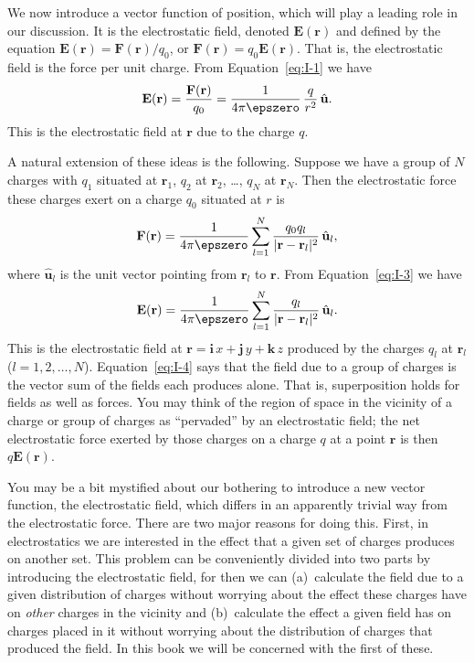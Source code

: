 We now introduce a vector function of position, which will play a leading role in our discussion. It is the electrostatic field, denoted $\mathbf{E}(\mathbf{r})$ and defined by the equation $\mathbf{E}(\mathbf{r}) = \mathbf{F}(\mathbf{r})/q_0$, or $\mathbf{F}(\mathbf{r}) = q_0 \mathbf{E}(\mathbf{r})$. That is, the electrostatic field is the force per unit charge. From Equation~\eqref{eq:I-1} we have
\begin{equation}
\mathbf{E}(\mathbf{r}) = \frac{\mathbf{F}(\mathbf{r})}{q_0} = \frac{1}{4\pi\epszero}\,\frac{q}{r^2}\,\hat{\mathbf{u}}.
\label{eq:I-2}
\end{equation}
This is the electrostatic field at $\mathbf{r}$ due to the charge $q$.

A natural extension of these ideas is the following. Suppose we have a group of $N$ charges with $q_1$ situated at $\mathbf{r}_1$, $q_2$ at $\mathbf{r}_2$, \ldots, $q_N$ at $\mathbf{r}_N$. Then the electrostatic force these charges exert on a charge $q_0$ situated at $r$ is
\begin{equation}
\mathbf{F}(\mathbf{r}) = \frac{1}{4\pi\epszero} \sum_{l=1}^{N} \frac{q_0 q_l}{|\mathbf{r} - \mathbf{r}_l|^2}\,\hat{\mathbf{u}}_l,
\label{eq:I-3}
\end{equation}
where $\hat{\mathbf{u}}_l$ is the unit vector pointing from $\mathbf{r}_l$ to $\mathbf{r}$. From Equation~\eqref{eq:I-3} we have
\begin{equation}
\mathbf{E}(\mathbf{r}) = \frac{1}{4\pi\epszero} \sum_{l=1}^{N} \frac{q_l}{|\mathbf{r} - \mathbf{r}_l|^2}\,\hat{\mathbf{u}}_l.
\label{eq:I-4}
\end{equation}
This is the electrostatic field at $\mathbf{r} = \mathbf{i}\,x + \mathbf{j}\,y + \mathbf{k}\,z$ produced by the charges $q_l$ at $\mathbf{r}_l$ ($l = 1, 2, \ldots, N$). Equation~\eqref{eq:I-4} says that the field due to a group of charges is the vector sum of the fields each produces alone. That is, superposition holds for fields as well as forces. You may think of the region of space in the vicinity of a charge or group of charges as ``pervaded'' by an electrostatic field; the net electrostatic force exerted by those charges on a charge $q$ at a point $\mathbf{r}$ is then $q\mathbf{E}(\mathbf{r})$.

You may be a bit mystified about our bothering to introduce a new vector function, the electrostatic field, which differs in an apparently trivial way from the electrostatic force. There are two major reasons for doing this. First, in electrostatics we are interested in the effect that a given set of charges produces on another set. This problem can be conveniently divided into two parts by introducing the electrostatic field, for then we can (a)~calculate the field due to a given distribution of charges without worrying about the effect these charges have on \emph{other} charges in the vicinity and (b)~calculate the effect a given field has on charges placed in it without worrying about the distribution of charges that produced the field. In this book we will be concerned with the first of these.

